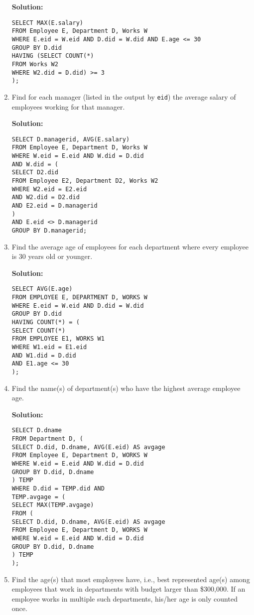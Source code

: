 \begin{enumerate}
\textbf{Solution:}
  
\begin{verbatim}
SELECT MAX(E.salary)
FROM Employee E, Department D, Works W
WHERE E.eid = W.eid AND D.did = W.did AND E.age <= 30
GROUP BY D.did
HAVING (SELECT COUNT(*)
FROM Works W2
WHERE W2.did = D.did) >= 3
);
\end{verbatim}
  
\item Find for each manager (listed in the output by \texttt{eid}) the average salary of employees working for that manager.
  
\textbf{Solution:}
  
\begin{verbatim}
SELECT D.managerid, AVG(E.salary)
FROM Employee E, Department D, Works W
WHERE W.eid = E.eid AND W.did = D.did
AND W.did = (
SELECT D2.did
FROM Employee E2, Department D2, Works W2
WHERE W2.eid = E2.eid 
AND W2.did = D2.did
AND E2.eid = D.managerid
)
AND E.eid <> D.managerid
GROUP BY D.managerid;
\end{verbatim}
  
\item Find the average age of employees for each department where every employee is 30 years old or younger.
  
\textbf{Solution:}
  
\begin{verbatim}
SELECT AVG(E.age)
FROM EMPLOYEE E, DEPARTMENT D, WORKS W
WHERE E.eid = W.eid AND D.did = W.did
GROUP BY D.did
HAVING COUNT(*) = (
SELECT COUNT(*)
FROM EMPLOYEE E1, WORKS W1
WHERE W1.eid = E1.eid
AND W1.did = D.did 
AND E1.age <= 30
);
\end{verbatim}
  
\item Find the name(s) of department(s) who have the highest average employee age.
  
\textbf{Solution:}
 
\begin{verbatim}
SELECT D.dname
FROM Department D, (
SELECT D.did, D.dname, AVG(E.eid) AS avgage
FROM Employee E, Department D, WORKS W
WHERE W.eid = E.eid AND W.did = D.did
GROUP BY D.did, D.dname
) TEMP
WHERE D.did = TEMP.did AND
TEMP.avgage = (
SELECT MAX(TEMP.avgage)
FROM (
SELECT D.did, D.dname, AVG(E.eid) AS avgage
FROM Employee E, Department D, WORKS W
WHERE W.eid = E.eid AND W.did = D.did
GROUP BY D.did, D.dname
) TEMP
);
\end{verbatim}
  
\item Find the age(s) that most employees have, i.e., best represented age(s) among employees that work in departments with budget larger than \$300,000. If an employee works in multiple such departments, his/her age is only counted once.
  

\end{enumerate}
